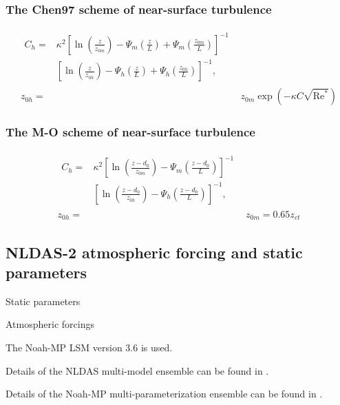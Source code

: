 \documentclass[essd]{copernicus}
\begin{document}
\subsubsection{The Chen97 scheme of near-surface turbulence}

\begin{align}
    \begin{split}
        C_h = & \kappa^2 \left[ \ln\left(\frac{z}{z_{0m}}\right)
        - \Psi_{m}\left(\frac{z}{L}\right)
         + \Psi_{m}\left(\frac{z_{0m}}{L}\right) \right]^{-1} \\
        & \left[ \ln\left(\frac{z}{z_{0h}}\right)
        - \Psi_{h}\left(\frac{z}{L}\right)
        + \Psi_{h}\left(\frac{z_{0h}}{L}\right) \right]^{-1} \text{,}
    \end{split}                                      \\
    z_{0h} = & z_{0m} \exp\left(-\kappa C \sqrt{\text{Re}^*}\right)
\end{align}


\subsubsection{The M-O scheme of near-surface turbulence}

\begin{align}
    \begin{split}
        C_h = & \kappa^2 \left[ \ln\left(\frac{z-d_0}{z_{0m}}\right)
        - \Psi_{m}\left(\frac{z-d_0}{L}\right) \right]^{-1} \\
        & \left[ \ln\left(\frac{z-d_0}{z_{0h}}\right)
        - \Psi_{h}\left(\frac{z-d_0}{L}\right) \right]^{-1}
        \text{,}
    \end{split}      \\
    z_{0h} = & z_{0m} = 0.65 z_{ct}
\end{align}


\subsection{NLDAS-2 atmospheric forcing and static parameters} \label{sec:data:nldas}

Static parameters

Atmospheric forcings

The Noah-MP LSM version 3.6 is used.

Details of the NLDAS multi-model ensemble can be found in
\citet{xia2012JGRA,xia2012JGRAa,fei2021WRR}.

Details of the Noah-MP multi-parameterization ensemble can be found in
\citet{zheng2019WRR,zheng2020JAMES,fei2021WRR}.
\end{document}
